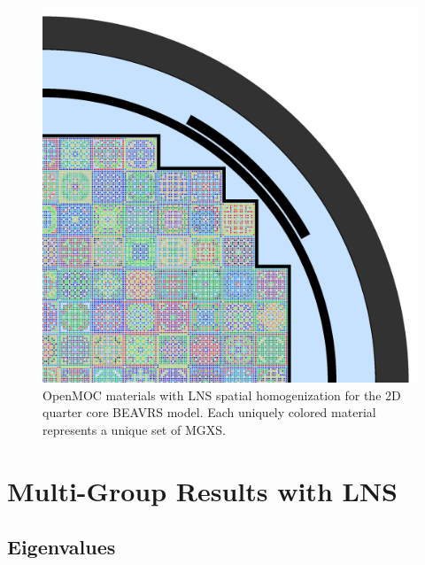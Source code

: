 \begin{figure}[h!]
\centering
\includegraphics[width=\linewidth]{figures/patterns/lns/full-core/materials}
\caption{}
\caption[Depiction of LNS spatially homogenized materials for quarter core BEAVRS]{OpenMOC materials with \ac{LNS} spatial homogenization for the 2D quarter core \ac{BEAVRS} model. Each uniquely colored material represents a unique set of \ac{MGXS}.}
\label{fig:chap9-lns-materials-beavrs}
\end{figure}


\section{Multi-Group Results with LNS}
\label{subsec:chap9-lns-results}


\subsection{Eigenvalues}
\label{subsec:chap9-lns-eigenvalues}

